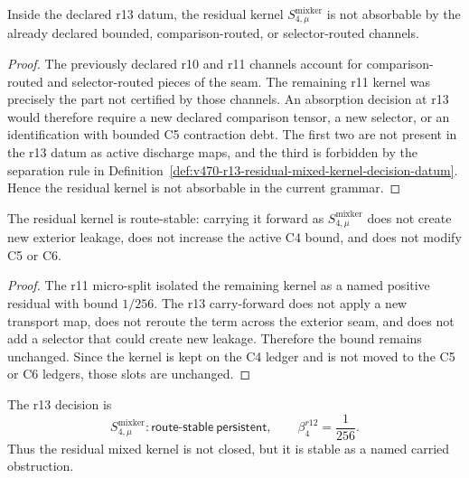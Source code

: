 \begin{lemma}
\label{lem:v470-r13-nonabsorption-test}
Inside the declared r13 datum, the residual kernel
\(S_{4,\mu}^{\mathrm{mixker}}\) is not absorbable by the already declared
bounded, comparison-routed, or selector-routed channels.
\end{lemma}

\begin{proof}
The previously declared r10 and r11 channels account for comparison-routed and
selector-routed pieces of the seam.  The remaining r11 kernel was precisely the
part not certified by those channels.  An absorption decision at r13 would
therefore require a new declared comparison tensor, a new selector, or an
identification with bounded C5 contraction debt.  The first two are not present
in the r13 datum as active discharge maps, and the third is forbidden by the
separation rule in Definition~\ref{def:v470-r13-residual-mixed-kernel-decision-datum}.
Hence the residual kernel is not absorbable in the current grammar.
\end{proof}

\begin{lemma}
\label{lem:v470-r13-route-stability-test}
The residual kernel is route-stable: carrying it forward as
\(S_{4,\mu}^{\mathrm{mixker}}\) does not create new exterior leakage, does not
increase the active C4 bound, and does not modify C5 or C6.
\end{lemma}

\begin{proof}
The r11 micro-split isolated the remaining kernel as a named positive residual
with bound \(1/256\).  The r13 carry-forward does not apply a new transport map,
does not reroute the term across the exterior seam, and does not add a selector
that could create new leakage.  Therefore the bound remains unchanged.  Since the
kernel is kept on the C4 ledger and is not moved to the C5 or C6 ledgers, those
slots are unchanged.
\end{proof}

\begin{proposition}
\label{prop:v470-r13-residual-mixed-kernel-decision}
The r13 decision is
\[
S_{4,\mu}^{\mathrm{mixker}}:\mathsf{route\mbox{-}stable\ persistent},
\qquad
\beta_4^{r12}=\frac1{256}.
\]
Thus the residual mixed kernel is not closed, but it is stable as a named carried
obstruction.
\end{proposition}

